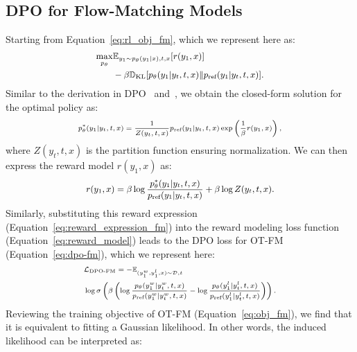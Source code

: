 \documentclass[11pt]{article}
\begin{document}
\subsection{DPO for Flow-Matching Models}\label{sec:appendix-derivation-fm}

Starting from Equation~\ref{eq:rl_obj_fm}, which we represent here as:
\[{\small
\begin{aligned}
\max_{p_\theta} & \mathbb{E}_{y_1 \sim p_\theta(y_1|x), t, x}[r(y_1,x)] \\
& - \beta \mathbb{D}_{\text{KL}}[p_\theta(y_1|y_t,t,x) \| p_{\text{ref}}(y_1|y_t,t,x)].
\end{aligned}
}\]
Similar to the derivation in DPO~\cite{dpo} and~\citet{wallace2024diffusion}, we obtain the closed-form solution for the optimal policy as:
\begin{equation}
    {\scriptsize
    \begin{aligned}
    p_\theta^*(y_1 | y_t, t, x) = \frac{1}{Z(y_t, t, x)} p_{\text{ref}}(y_1 | y_t, t, x) \exp\left(\frac{1}{\beta} r(y_1, x)\right),
    \end{aligned}
    }
\end{equation}
where \( Z(y_t, t, x) \) is the partition function ensuring normalization. We can then express the reward model \( r(y_1, x) \) as:
\begin{equation}
    {\small
    \begin{aligned}
    r(y_1, x) = \beta \log \frac{p_\theta^*(y_1 | y_t, t, x)}{p_{\text{ref}}(y_1 | y_t, t, x)} + \beta \log Z(y_t, t, x).
    \end{aligned}
    }
    \label{eq:reward_expression_fm}
\end{equation}
Similarly, substituting this reward expression (Equation~\ref{eq:reward_expression_fm}) into the reward modeling loss function (Equation~\ref{eq:reward_model}) leads to the DPO loss for OT-FM (Equation~\ref{eq:dpo-fm}), which we represent here:
\[
{\scriptsize
\begin{aligned}
& \mathcal{L}_{\text{DPO-FM}} = -
\mathbb{E}_{(y_1^w, y_1^l, x) \sim \mathcal{D}, t} \\
& \log \sigma \left( \beta \left( \log \frac{p_\theta(y_1^w|y_t^w,t,x)}{p_{\text{ref}}(y_1^w|y_t^w,t,x)}
- \log \frac{p_\theta(y_1^l|y_t^l,t,x)}{p_{\text{ref}}(y_1^l|y_t^l,t,x)} \right) \right).
\end{aligned}
}
\]
Reviewing the training objective of OT-FM (Equation~\ref{eq:obj_fm}), we find that it is equivalent to fitting a Gaussian likelihood. In other words, the induced likelihood can be interpreted as:
\end{document}
